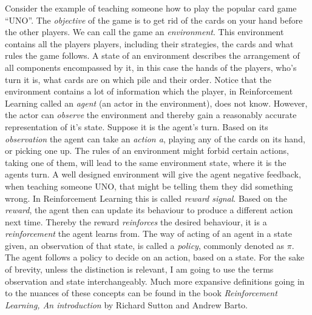 \noindent
Consider the example of teaching someone how to play the popular card game “UNO”. The \textit{objective} of the game is to get rid of the cards on your hand before the other players. We can call the game an \textit{environment}. This environment contains all the players players, including their strategies, the cards and what rules the game follows. A state of an environment describes the arrangement of all components encompassed by it, in this case the hands of the players, who's turn it is, what cards are on which pile and their order. Notice that the environment contains a lot of information which the player, in Reinforcement Learning called an \textit{agent} (an actor in the environment), does not know. However, the actor can \textit{observe} the environment and thereby gain a reasonably accurate representation of it’s state. Suppose it is the agent's turn. Based on its \textit{observation} the agent can take an \textit{action a}, playing any of the cards on its hand, or picking one up. The rules of an environment might forbid certain actions, taking one of them, will lead to the same environment state, where it is the agents turn. A well designed environment will give the agent negative feedback, when teaching someone UNO, that might be telling them they did something wrong. In Reinforcement Learning this is called \textit{reward signal}. Based on the \textit{reward}, the agent then can update its behaviour to produce a different action next time. Thereby the reward \textit{reinforces} the desired behaviour, it is a \textit{reinforcement} the agent learns from. The way of acting of an agent in a state given, an observation of that state, is called a \textit{policy}, commonly denoted as $\pi$. The agent follows a policy to decide on an action, based on a state.
\newline
For the sake of brevity, unless the distinction is relevant, I am going to use the terms observation and state interchangeably. Much more expansive definitions going in to the nuances of these concepts can be found in the book \textit{Reinforcement Learning, An introduction} by Richard Sutton and Andrew Barto. \cite{sutton_reinforcement_2018}

